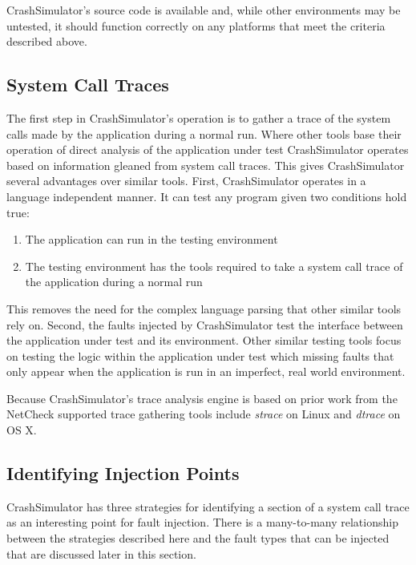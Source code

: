         CrashSimulator's source code is available and, while other environments may be untested, it should function
        correctly on any platforms that meet the criteria described above.

    \subsection{System Call Traces}

        The first step in CrashSimulator's operation is to gather a trace of the system calls made by the application
        during a normal run. Where other tools base their operation of direct analysis of the application under test
        CrashSimulator operates based on information gleaned from system call traces. This gives CrashSimulator several
        advantages over similar tools. First, CrashSimulator operates in a language independent manner. It can test any
        program given two conditions hold true:

        \begin{enumerate}
            \item{The application can run in the testing environment}
            \item{The testing environment has the tools required to take a system call trace of the application during
            a normal run}
        \end{enumerate}

        This removes the need for the complex language parsing that other similar tools rely on. Second, the faults
        injected by CrashSimulator test the interface between the application under test and its environment. Other
        similar testing tools focus on testing the logic within the application under test which missing faults that
        only appear when the application is run in an imperfect, real world environment.

        Because CrashSimulator's trace analysis engine is based on prior work from the NetCheck supported trace
        gathering tools include \emph{strace} on Linux and \emph{dtrace} on OS X.

    \subsection{Identifying Injection Points}

        CrashSimulator has three strategies for identifying a section of a system call trace as an interesting point for
        fault injection. There is a many-to-many relationship between the strategies described here and the fault types
        that can be injected that are discussed later in this section.

